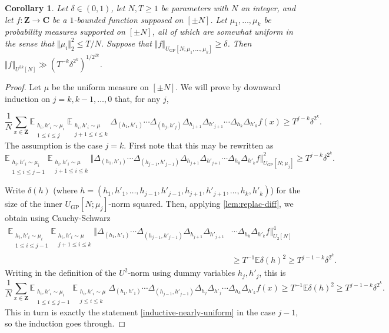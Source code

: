 \documentclass[11pt,reqno]{amsart}
\numberwithin{equation}{section}
\newtheorem{corollary}[theorem]{Corollary}
\theoremstyle{definition}
\theoremstyle{remark}
\newcommand{\mb}{\mathbb}
\renewcommand{\le}{\leqslant}
\renewcommand{\ge}{\geqslant}
\newcommand\Z{\mathbf{Z}}
\newcommand\C{\mathbf{C}}
\newcommand\E{\mb{E}}
\newcommand\GP{\operatorname{GP}}
\begin{document}
\begin{corollary}\label{cor53x}
Let $\delta \in (0,1)$, let $N, T \ge 1$ be parameters with $N$ an integer, and let $f : \Z \rightarrow \C$ be a $1$-bounded function supposed on $[\pm N]$. Let $\mu_1,\dots, \mu_k$ be probability measures supported on $[\pm N]$, all of which are somewhat uniform in the sense that $\Vert \mu_i \Vert_2^2 \le T/N$. Suppose that $\Vert f \Vert_{U_{\GP}[N;\mu_1,\dots, \mu_k]} \ge \delta$. Then $\Vert f \Vert_{U^{2k}[N]} \gg (T^{-k} \delta^{2^k})^{1/2^{2k}}$.
\end{corollary}
\begin{proof} Let $\mu$ be the uniform measure on $[\pm N]$.
We will prove by downward induction on $j = k, k - 1,\dots,0$ that, for any $j$, 

\begin{equation}\label{inductive-nearly-uniform} \frac{1}{N} \sum_{x \in \Z} \E_{\substack{h_i, h'_i \sim \mu_i \\ 1 \le i \le j}} \E_{\substack{h_i, h'_i \sim \mu \\ j+1 \le i \le k}} \Delta_{(h_1, h'_1)} \cdots \Delta_{(h_{j}, h'_{j})} \Delta_{h_{j+1}} \Delta_{h'_{j+1}} \cdots \Delta_{h_{k}} \Delta_{h'_{k}} f (x) \ge  T^{j - k} \delta^{2^k} .\end{equation}
The assumption is  the case $j = k$.
First note that this may be rewritten as 
\[\E_{\substack{h_i, h'_i \sim \mu_i \\ 1 \le i \le j-1}} \E_{\substack{h_i, h'_i \sim \mu \\ j+1 \le i \le k}}\Vert \Delta_{(h_1, h'_1)} \cdots \Delta_{(h_{j-1}, h'_{j-1})} \Delta_{h_{j+1}} \Delta_{h'_{j+1}} \cdots \Delta_{h_{k}} \Delta_{h'_{k}} f \Vert^2_{U_{\GP}[N;\mu_j]} \ge  T^{j - k} \delta^{2^k} .\]


Write $\delta(h)$ (where $h = (h_1, h'_1,\dots, h_{j-1}, h'_{j-1}, h_{j+1}, h'_{j+1},\dots, h_k, h'_k)$) for the size of the inner $U_{\GP}[N; \mu_j]$-norm squared. Then, applying \cref{lem:replac-diff}, we obtain using Cauchy-Schwarz
\begin{align*} \E_{\substack{h_i, h'_i \sim \mu_i \\ 1 \le i \le j-1}} \E_{\substack{h_i, h'_i \sim \mu \\ j+1 \le i \le k}}\Vert \Delta_{(h_1, h'_1)} \cdots \Delta_{(h_{j-1}, h'_{j-1})} \Delta_{h_{j+1}} \Delta_{h'_{j+1}} & \cdots \Delta_{h_{k}} \Delta_{h'_{k}} f \Vert^4_{U_2[N]} \\ & \ge T^{-1} \E \delta(h)^2 \ge T^{j - 1- k} \delta^{2^k}.\end{align*} Writing in the definition of the $U^2$-norm using dummy variables $h_j, h'_j$, this is
\[ \frac{1}{N}\sum_{x \in \Z}\E_{\substack{h_i, h'_i \sim \mu_i \\ 1 \le i \le j-1}} \E_{\substack{h_i, h'_i \sim \mu \\ j \le i \le k}}\Delta_{(h_1, h'_1)} \cdots \Delta_{(h_{j-1}, h'_{j-1})} \Delta_{h_{j}} \Delta_{h'_{j}} \cdots \Delta_{h_{k}} \Delta_{h'_{k}} f (x) \ge T^{-1} \E \delta(h)^2 \ge T^{j-1-k} \delta^{2^k}.\]
This in turn is exactly the statement \cref{inductive-nearly-uniform} in the case $j -1$, so the induction goes through.


\end{proof}
\end{document}
